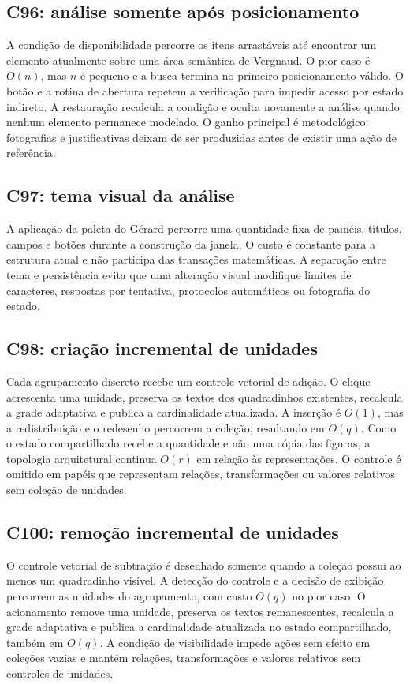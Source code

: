 \documentclass[12pt,a4paper]{article}
\begin{document}
\subsection{C96: análise somente após posicionamento}
A condição de disponibilidade percorre os itens arrastáveis até encontrar um elemento atualmente sobre uma área semântica de Vergnaud. O pior caso é $O(n)$, mas $n$ é pequeno e a busca termina no primeiro posicionamento válido. O botão e a rotina de abertura repetem a verificação para impedir acesso por estado indireto. A restauração recalcula a condição e oculta novamente a análise quando nenhum elemento permanece modelado. O ganho principal é metodológico: fotografias e justificativas deixam de ser produzidas antes de existir uma ação de referência.

\subsection{C97: tema visual da análise}
A aplicação da paleta do Gérard percorre uma quantidade fixa de painéis, títulos, campos e botões durante a construção da janela. O custo é constante para a estrutura atual e não participa das transações matemáticas. A separação entre tema e persistência evita que uma alteração visual modifique limites de caracteres, respostas por tentativa, protocolos automáticos ou fotografia do estado.

\subsection{C98: criação incremental de unidades}
Cada agrupamento discreto recebe um controle vetorial de adição. O clique acrescenta uma unidade, preserva os textos dos quadradinhos existentes, recalcula a grade adaptativa e publica a cardinalidade atualizada. A inserção é $O(1)$, mas a redistribuição e o redesenho percorrem a coleção, resultando em $O(q)$. Como o estado compartilhado recebe a quantidade e não uma cópia das figuras, a topologia arquitetural continua $O(r)$ em relação às representações. O controle é omitido em papéis que representam relações, transformações ou valores relativos sem coleção de unidades.

\subsection{C100: remoção incremental de unidades}
O controle vetorial de subtração é desenhado somente quando a coleção possui ao menos um quadradinho visível. A detecção do controle e a decisão de exibição percorrem as unidades do agrupamento, com custo $O(q)$ no pior caso. O acionamento remove uma unidade, preserva os textos remanescentes, recalcula a grade adaptativa e publica a cardinalidade atualizada no estado compartilhado, também em $O(q)$. A condição de visibilidade impede ações sem efeito em coleções vazias e mantém relações, transformações e valores relativos sem controles de unidades.
\end{document}
